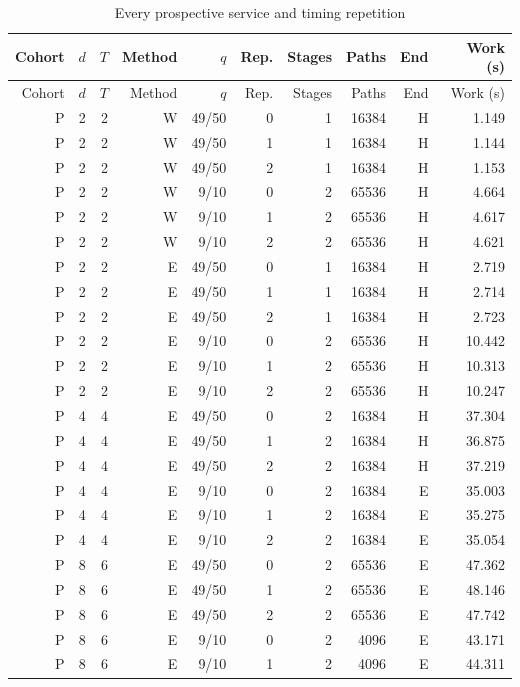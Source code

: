 \begingroup\small\setlength{\tabcolsep}{3pt}
\begin{longtable}{rrrrrrrrrr}
\caption{Every prospective service and timing repetition}\label{tab:services56}\\
\toprule
Cohort & $d$ & $T$ & Method & $q$ & Rep. & Stages & Paths & End & Work (s) \\
\midrule\endfirsthead
\toprule
Cohort & $d$ & $T$ & Method & $q$ & Rep. & Stages & Paths & End & Work (s) \\
\midrule\endhead
P & 2 & 2 & W & 49/50 & 0 & 1 & 16384 & H & 1.149 \\
P & 2 & 2 & W & 49/50 & 1 & 1 & 16384 & H & 1.144 \\
P & 2 & 2 & W & 49/50 & 2 & 1 & 16384 & H & 1.153 \\
P & 2 & 2 & W & 9/10 & 0 & 2 & 65536 & H & 4.664 \\
P & 2 & 2 & W & 9/10 & 1 & 2 & 65536 & H & 4.617 \\
P & 2 & 2 & W & 9/10 & 2 & 2 & 65536 & H & 4.621 \\
P & 2 & 2 & E & 49/50 & 0 & 1 & 16384 & H & 2.719 \\
P & 2 & 2 & E & 49/50 & 1 & 1 & 16384 & H & 2.714 \\
P & 2 & 2 & E & 49/50 & 2 & 1 & 16384 & H & 2.723 \\
P & 2 & 2 & E & 9/10 & 0 & 2 & 65536 & H & 10.442 \\
P & 2 & 2 & E & 9/10 & 1 & 2 & 65536 & H & 10.313 \\
P & 2 & 2 & E & 9/10 & 2 & 2 & 65536 & H & 10.247 \\
P & 4 & 4 & E & 49/50 & 0 & 2 & 16384 & H & 37.304 \\
P & 4 & 4 & E & 49/50 & 1 & 2 & 16384 & H & 36.875 \\
P & 4 & 4 & E & 49/50 & 2 & 2 & 16384 & H & 37.219 \\
P & 4 & 4 & E & 9/10 & 0 & 2 & 16384 & E & 35.003 \\
P & 4 & 4 & E & 9/10 & 1 & 2 & 16384 & E & 35.275 \\
P & 4 & 4 & E & 9/10 & 2 & 2 & 16384 & E & 35.054 \\
P & 8 & 6 & E & 49/50 & 0 & 2 & 65536 & E & 47.362 \\
P & 8 & 6 & E & 49/50 & 1 & 2 & 65536 & E & 48.146 \\
P & 8 & 6 & E & 49/50 & 2 & 2 & 65536 & E & 47.742 \\
P & 8 & 6 & E & 9/10 & 0 & 2 & 4096 & E & 43.171 \\
P & 8 & 6 & E & 9/10 & 1 & 2 & 4096 & E & 44.311 \\

\end{longtable}
